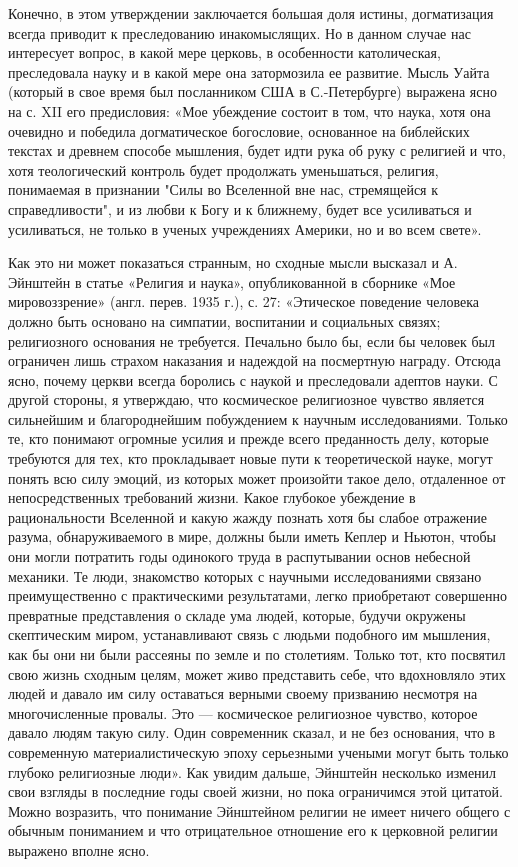 Конечно, в этом утверждении заключается большая доля истины, догматизация
всегда приводит к преследованию инакомыслящих. Но в данном случае нас
интересует вопрос, в какой мере церковь, в особенности католическая,
преследовала науку и в какой мере она затормозила ее развитие. Мысль Уайта
(который в свое время был посланником США в С.-Петербурге) выражена ясно на с.
XII его предисловия: «Мое убеждение состоит в том, что наука, хотя она
очевидно и победила догматическое богословие, основанное на библейских
текстах и древнем способе мышления, будет идти рука об руку с религией и
что, хотя теологический контроль будет продолжать уменьшаться, религия,
понимаемая в признании "Силы во Вселенной вне нас, стремящейся к
справедливости", и из любви к Богу и к ближнему, будет все усиливаться и
усиливаться, не только в ученых учреждениях Америки, но и во всем свете».

Как это ни может показаться странным, но сходные мысли высказал и А.
Эйнштейн в статье «Религия и наука», опубликованной в сборнике «Мое
мировоззрение» (англ. перев. 1935 г.), с. 27: «Этическое поведение человека
должно быть основано на симпатии, воспитании и социальных связях;
религиозного основания не требуется. Печально было бы, если бы человек был
ограничен лишь страхом наказания и надеждой на посмертную награду. Отсюда
ясно, почему церкви всегда боролись с наукой и преследовали адептов науки. С
другой стороны, я утверждаю, что космическое религиозное чувство является
сильнейшим и благороднейшим побуждением к научным исследованиями. Только те,
кто
понимают огромные усилия и прежде всего преданность делу, которые требуются для
тех, кто прокладывает новые пути к теоретической науке, могут понять всю
силу эмоций, из которых может произойти такое дело, отдаленное от
непосредственных требований жизни. Какое глубокое убеждение в
рациональности Вселенной и какую жажду познать хотя бы слабое отражение
разума, обнаруживаемого в мире, должны были иметь Кеплер и Ньютон, чтобы они
могли потратить годы одинокого труда в распутывании основ небесной
механики. Те люди, знакомство которых с научными исследованиями связано
преимущественно с практическими результатами, легко приобретают совершенно
превратные представления о складе ума людей, которые, будучи окружены
скептическим миром, устанавливают связь с людьми подобного им мышления, как бы
они ни были рассеяны по земле и по столетиям. Только тот, кто посвятил свою
жизнь сходным целям, может живо представить себе, что вдохновляло этих
людей и давало им силу оставаться верными своему призванию несмотря на
многочисленные провалы. Это --- космическое религиозное чувство, которое
давало людям такую силу. Один современник сказал, и не без основания, что в
современную материалистическую эпоху серьезными учеными могут быть только
глубоко религиозные люди». Как увидим дальше, Эйнштейн несколько изменил
свои взгляды в последние годы своей жизни, но пока ограничимся этой
цитатой. Можно возразить, что понимание Эйнштейном религии не имеет ничего
общего с обычным пониманием и что отрицательное отношение его к церковной
религии выражено вполне ясно.

